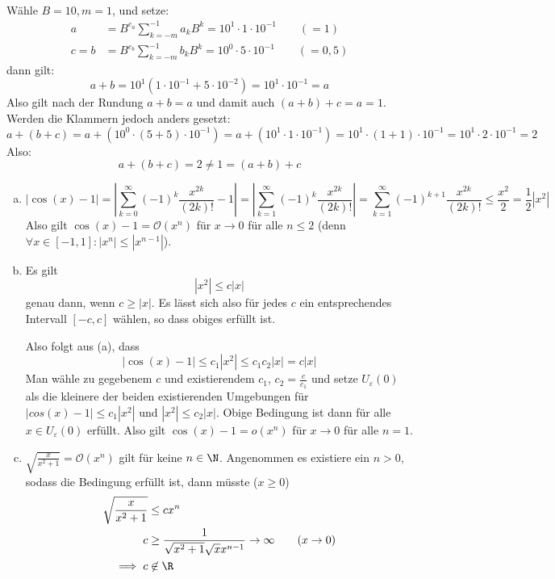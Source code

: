 \documentclass{mywork}
\begin{document}
\begin{aufgabe}~

Wähle $B=10, m=1$, und setze:
\begin{align*}
a &= B^{e_a}\sum_{k=-m}^{-1}a_kB^k=10^1\cdot 1\cdot 10^{-1} \qquad (=1)\\
c=b &= B^{e_b}\sum_{k=-m}^{-1}b_kB^k=10^0\cdot 5\cdot 10^{-1} \qquad (=0,5)
\end{align*}
dann gilt:
\[
a+b
=10^1(1\cdot 10^{-1}+5\cdot 10^{-2})
=10^1\cdot 10^{-1}
=a
\]
Also gilt nach der Rundung $a+b=a$ und damit auch $(a+b)+c=a=1$.
Werden die Klammern jedoch anders gesetzt:
\[
a+(b+c)
=a+(10^0\cdot (5+5)\cdot 10^{-1})
=a+(10^1\cdot 1 \cdot 10^{-1})
=10^1\cdot (1+1) \cdot 10^{-1}
=10^1\cdot 2\cdot 10^{-1}
=2
\]
Also:
\[
a+(b+c)=2\neq 1=(a+b)+c
\]
\end{aufgabe}

\begin{aufgabe}
	\begin{enumerate}[a)]
\item
\[
|\cos(x)-1|
=\left|\sum_{k=0}^\infty(-1)^k\frac {x^{2k}}{(2k)!}-1\right|
=\left|\sum_{k=1}^\infty(-1)^k\frac {x^{2k}}{(2k)!}\right|
=\sum_{k=1}^\infty(-1)^{k+1}\frac {x^{2k}}{(2k)!}
\le \frac {x^2}2
=\frac 12\left|x^2\right|
\]
Also gilt $\cos(x)-1=\mathcal O(x^n)$ für $x\to 0$ für alle $n\le 2$
(denn $\forall x\in [-1,1]:\left|x^n\right|\le \left|x^{n-1}\right|$).

\item
Es gilt
\[
\left|x^2\right|\le c|x|
\]
genau dann, wenn $c\ge|x|$. 
Es lässt sich also für jedes $c$ ein entsprechendes Intervall $[-c,c]$ wählen,
so dass obiges erfüllt ist.

Also folgt aus (a), dass
\[
|\cos(x)-1|\le c_1\left|x^2\right| \le c_1c_2|x|=c|x|
\]
Man wähle zu gegebenem $c$ und existierendem $c_1$, $c_2=\frac c{c_1}$ und setze
$U_\varepsilon(0)$ als die kleinere der beiden existierenden Umgebungen für
$|cos(x)-1|\le c_1\left|x^2\right|$ und $|x^2|\le c_2|x|$.
Obige Bedingung ist dann für alle $x\in U_\varepsilon(0)$ erfüllt.
Also gilt $\cos(x)-1=o(x^n)$ für $x\to 0$ für alle $n=1$.
\item
$\sqrt{\frac x{x^2+1}} = \mathcal O(x^n)$ gilt für keine $n\in\N$.
Angenommen es existiere ein $n>0$, sodass die Bedingung erfüllt ist, dann müsste ($x\ge 0$)
\begin{align*}
\sqrt{\frac x{x^2+1}} &\le cx^n\\
c&\ge \frac 1{\sqrt{x^2+1}\sqrt x x^{n-1}} \to \infty \qquad (x\to 0)\\
\implies c&\not\in\R
\end{align*}



\end{enumerate}
\end{aufgabe}
\end{document}
